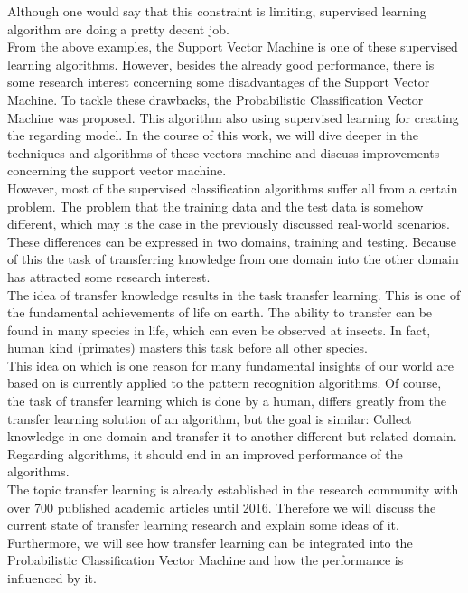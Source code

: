 Although one would say that this constraint is limiting, supervised learning algorithm are doing a pretty decent job.\\
From the above examples, the Support Vector Machine is one of these supervised learning algorithms. 
However, besides the already good performance, there is some research interest concerning some disadvantages of the Support Vector Machine.
To tackle these drawbacks, the Probabilistic Classification Vector Machine was proposed.
This algorithm also using supervised learning for creating the regarding model.
In the course of this work, we will dive deeper in the techniques and algorithms of these vectors machine and discuss improvements concerning the support vector machine.\\
However, most of the supervised classification algorithms suffer all from a certain problem. 
The problem that the training data and the test data is somehow different, which may is the case in the previously discussed real-world scenarios.
These differences can be expressed in two domains, training and testing.
Because of this the task of transferring knowledge from one domain into the other domain has attracted some research interest.\\
The idea of transfer knowledge results in the task transfer learning. 
This is one of the fundamental achievements of life on earth.
The ability to transfer can be found in many species in life, which can even be observed at insects.
In fact, human kind (primates) masters this task before all other species.\\
This idea on which is one reason for many fundamental insights of our world are based on is currently applied to the pattern recognition algorithms.
Of course, the task of transfer learning which is done by a human, differs greatly from the transfer learning solution of an algorithm, but the goal is similar:
Collect knowledge in one domain and transfer it to another different but related domain. Regarding algorithms, it should end in an improved performance of the algorithms.\\
The topic transfer learning is already established in the research community with over 700 published academic articles until 2016.
Therefore we will discuss the current state of transfer learning research and explain some ideas of it.
Furthermore, we will see how transfer learning can be integrated into the Probabilistic Classification Vector Machine and how the performance is influenced by it.
\cite{Paluszek.2017}\cite{Wu.2008}\cite{Singh.2010}\cite{TrevorHastie.2009}\cite{Theodoridis.2015}\cite{Buchholtz.1982} \cite{Theodoridis.2008} \cite{Weiss.2016}\cite{Bishop.2009}\cite{Tipping.2001}\cite{Chen.2009}\cite{Pan.2010}\cite{Weiss.2016}